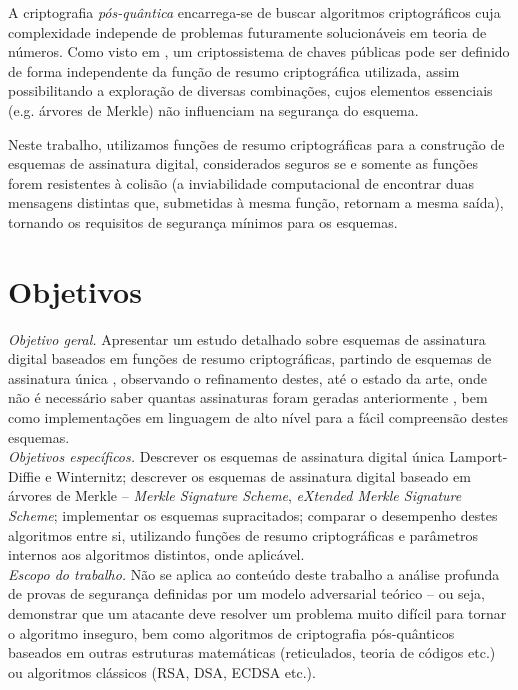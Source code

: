 \documentclass{article}
\begin{document}
A criptografia \emph{pós-quântica} encarrega-se de buscar algoritmos
criptográficos cuja complexidade independe de problemas futuramente
solucionáveis em teoria de números. Como visto em \cite{Merkle1990}, um
criptossistema de chaves públicas pode ser definido de forma independente da
função de resumo criptográfica utilizada, assim possibilitando a exploração de
diversas combinações, cujos elementos essenciais (e.g. árvores de Merkle) não
influenciam na segurança do esquema.

Neste trabalho, utilizamos funções de resumo criptográficas para a construção
de esquemas de assinatura digital, considerados seguros se e somente as funções
forem resistentes à colisão (a inviabilidade computacional de encontrar duas
mensagens distintas que, submetidas à mesma função, retornam a mesma saída),
tornando os requisitos de segurança mínimos para os esquemas.

\section{Objetivos}

\noindent \emph{Objetivo geral.} Apresentar um estudo detalhado sobre esquemas
de assinatura digital baseados em funções de resumo criptográficas, partindo de
esquemas de assinatura única \cite{Lamport1979}, observando o refinamento
destes, até o estado da arte, onde não é necessário saber quantas assinaturas
foram geradas anteriormente \cite{Bernstein2015}, bem como implementações em
linguagem de alto nível para a fácil compreensão destes esquemas. \\

\noindent \emph{Objetivos específicos.} Descrever os esquemas de assinatura
digital única Lamport-Diffie e Winternitz; descrever os esquemas de assinatura
digital baseado em árvores de Merkle -- \emph{Merkle Signature Scheme},
\emph{eXtended Merkle Signature Scheme}; implementar os esquemas supracitados;
comparar o desempenho destes algoritmos entre si, utilizando funções de resumo
criptográficas e parâmetros internos aos algoritmos distintos, onde aplicável.
\\

\noindent \emph{Escopo do trabalho.} Não se aplica ao conteúdo deste trabalho
a análise profunda de provas de segurança definidas por um modelo adversarial
teórico -- ou seja, demonstrar que um atacante deve resolver um problema muito
difícil para tornar o algoritmo inseguro, bem como algoritmos de criptografia
pós-quânticos baseados em outras estruturas matemáticas (reticulados, teoria
de códigos etc.) ou algoritmos clássicos (RSA, DSA, ECDSA etc.). \\
\end{document}
